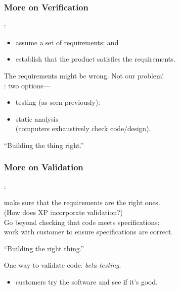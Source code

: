 \begin{frame}
\frametitle{More on Verification}
\begin{changemargin}{1cm}

:

\begin{itemize}
\item  assume a set of requirements; and
\item  establish that the product satisfies the
requirements.
\end{itemize}
The requirements might be wrong. Not our problem!\\[1em]

: two options---
\begin{itemize}
\item testing (as seen previously);
\item static analysis\\ \quad (computers exhaustively check code/design).
\end{itemize}

\end{changemargin}

\begin{center}
``Building the thing right.''
\end{center}
\end{frame}

\begin{frame}
\frametitle{More on Validation}
\begin{changemargin}{1cm}

:

make sure that the requirements are the right ones.\\[1em]

(How does XP incorporate validation?)\\[1em]

Go beyond checking that code meets
specifications; \\
work with customer to ensure
specifications are correct. 


\end{changemargin}

\begin{center}
``Building the right thing.''
\end{center}


\begin{changemargin}{1cm}
One way to validate code: \emph{beta testing}.

\begin{itemize}
\item customers try the software and see if it's good.
\end{itemize}
\end{changemargin}

\end{frame}


